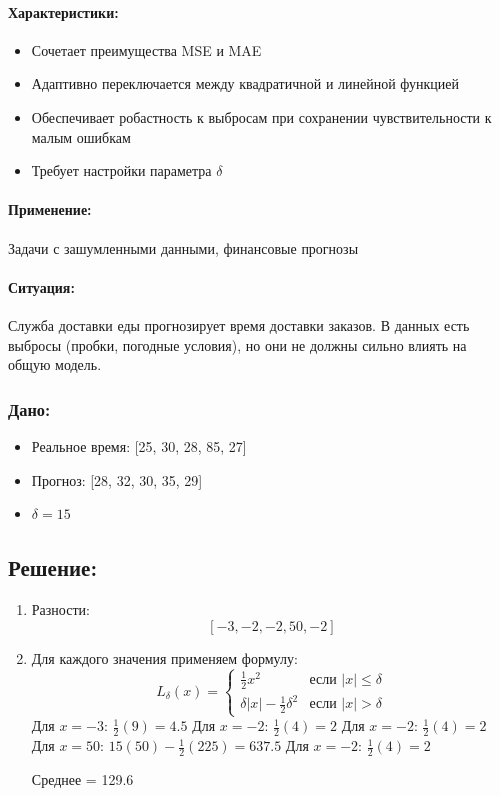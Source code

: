 \documentclass[12pt]{article}
\theoremstyle{definition}
\theoremstyle{definition}
\theoremstyle{definition}
\theoremstyle{remark}
\theoremstyle{remark}
\begin{document}
\paragraph{Характеристики:}
\begin{itemize}
    \item Сочетает преимущества MSE и MAE
    \item Адаптивно переключается между квадратичной и линейной функцией
    \item Обеспечивает робастность к выбросам при сохранении чувствительности к малым ошибкам
    \item Требует настройки параметра $\delta$
\end{itemize}

\paragraph{Применение:} Задачи с зашумленными данными, финансовые прогнозы

\paragraph{Ситуация:} Служба доставки еды прогнозирует время доставки заказов. В данных есть выбросы (пробки, погодные условия), но они не должны сильно влиять на общую модель.

\subsubsection*{Дано:}
\begin{itemize}
    \item Реальное время: [25, 30, 28, 85, 27]
    \item Прогноз: [28, 32, 30, 35, 29]
    \item $\delta = 15$
\end{itemize}

\subsection*{Решение:}

\begin{enumerate}
    \item {Разности:}
    \[
    [-3, -2, -2, 50, -2]
    \]
    
    \item{Для каждого значения применяем формулу:}
    \[
    L_\delta(x) = \begin{cases}
    \frac{1}{2}x^2 & \text{если } |x| \leq \delta \\
    \delta|x| - \frac{1}{2}\delta^2 & \text{если } |x| > \delta
    \end{cases}
    \]
    Для $x = -3$: $\frac{1}{2}(9) = 4.5$
    Для $x = -2$: $\frac{1}{2}(4) = 2$
    Для $x = -2$: $\frac{1}{2}(4) = 2$
    Для $x = 50$: $15(50) - \frac{1}{2}(225) = 637.5$
    Для $x = -2$: $\frac{1}{2}(4) = 2$
    
    Среднее = 129.6
\end{enumerate}
\end{document}
